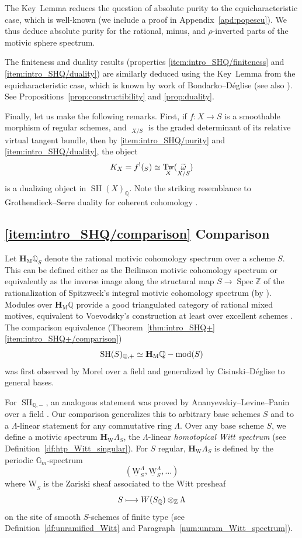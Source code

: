 \documentclass[11pt]{article}
\makeatletter
\numberwithin{equation}{section}\renewcommand{\encodingdefault}{TU}
\def\mto{\mathchoice{\longmapsto}{\mapsto}{\mapsto}{\mapsto}}
\DeclareRobustCommand{\mathbbm}[1]{\csname jepbb@#1\endcsname}
\newcommand{\modl}[1]{#1\textnormal{-}\mathrm{mod}}
\newcommand{\un}{\mathbbm 1}
\newcommand{\uW}{\underline{\mathrm W}}
\newcommand{\HM}{\mathbf H_{\mathrm{M}}}
\newcommand{\HW}{\mathbf H_{\mathrm{W}}}
\DeclareMathOperator{\SH}{SH}
\DeclareMathOperator{\spec}{Spec}
\DeclareMathOperator{\Tw}{Tw}
\DeclareMathOperator{\tomega}{\widetilde \omega}
\newcommand{\ZZ} {\mathbb Z}
\newcommand{\QQ} {\mathbb Q}
\newcommand{\GG} {\mathbb{G}_m}
\theoremstyle{remark}
\theoremstyle{definition}
\numberwithin{equation}{thm}
\makeatother
\begin{document}
The Key~Lemma reduces the question of absolute purity to the equicharacteristic case, which is well-known (we include a proof in Appendix~\ref{apd:popescu}).
We thus deduce absolute purity for the rational, minus, and $\rho$-inverted parts of the motivic sphere spectrum.

The finiteness and duality results (properties \eqref{item:intro_SHQ/finiteness} and \eqref{item:intro_SHQ/duality}) are similarly deduced using the Key~Lemma from the equicharacteristic case, which is known by work of Bondarko--Déglise \cite{BD1} (see also \cite[\S3.1]{ElmantoKhan}).
See Propositions~\ref{prop:constructibility} and \ref{prop:duality}.

Finally, let us make the following remarks.
First, if $f : X \to S$ is a smoothable morphism of regular schemes, and $\tomega_{X/S}$ is the graded determinant of its relative virtual tangent bundle, then by \eqref{item:intro_SHQ/purity} and \eqref{item:intro_SHQ/duality}, the object
\[
K_X = f^!(\un_S) \simeq \Tw_X(\tomega_{X/S})
\]
is a dualizing object in $\SH(X)_\QQ$.
Note the striking resemblance to Grothendieck--Serre duality for coherent cohomology \cite[Def.\,III.2, Prop.\,7.2]{HartshorneRD}.

\subsection*{\eqref{item:intro_SHQ/comparison} Comparison}

Let $\HM\QQ_S$ denote the rational motivic cohomology spectrum over a scheme $S$.
This can be defined either as the Beilinson motivic cohomology spectrum \cite[Def.\,14.1.2]{CD3} or equivalently as the inverse image along the structural map $S \to \spec{\ZZ}$ of the rationalization of Spitzweck's integral motivic cohomology spectrum (by \cite[Th.\,7.14]{SpitzweckSpectrum}).
Modules over $\HM\QQ$ provide a good triangulated category of rational mixed motives, equivalent to Voevodsky's construction at least over excellent schemes \cite[\S16.1]{CD3}.
The comparison equivalence (Theorem~\ref{thm:intro_SHQ+}\eqref{item:intro_SHQ+/comparison})
\[
\SH(S)_{\QQ,+} \simeq \modl{\HM\QQ}(S)
\]
was first observed by Morel over a field \cite{MorelSplitting} and generalized by Cisinski--Déglise \cite[\S 16.2]{CD3} to general bases.

For $\SH_{\QQ,-}$, an analogous statement was proved by Ananyevskiy--Levine--Panin over a field \cite[\S 4]{ALP}.
Our comparison generalizes this to arbitrary base schemes $S$ and to a $\Lambda$-linear statement for any commutative ring $\Lambda$.
Over any base scheme $S$, we define a motivic spectrum $\HW \Lambda_S$, the $\Lambda$-linear \emph{homotopical Witt spectrum} (see Definition~\ref{df:htp_Witt_singular}).
For $S$ regular, $\HW \Lambda_S$ is defined by the periodic $\GG$-spectrum
\[
(\uW_S^\Lambda,\uW_S^\Lambda,\hdots)
\]
where $\uW_S$ is the Zariski sheaf associated to the Witt presheaf
\[
S \mto W(S_\QQ) \otimes_\ZZ \Lambda
\]
on the site of smooth $S$-schemes of finite type (see Definition~\ref{df:unramified_Witt} and Paragraph~\ref{num:unram_Witt_spectrum}).
\end{document}
